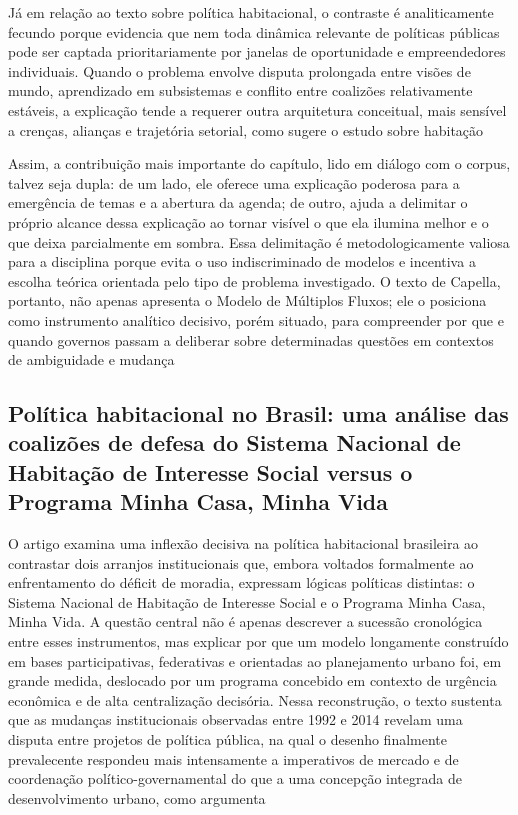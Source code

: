 \documentclass[12pt,a4paper]{article}
\begin{document}
Já em relação ao texto sobre política habitacional, o contraste é analiticamente fecundo porque evidencia que nem toda dinâmica relevante de políticas públicas pode ser captada prioritariamente por janelas de oportunidade e empreendedores individuais. Quando o problema envolve disputa prolongada entre visões de mundo, aprendizado em subsistemas e conflito entre coalizões relativamente estáveis, a explicação tende a requerer outra arquitetura conceitual, mais sensível a crenças, alianças e trajetória setorial, como sugere o estudo sobre habitação\parencite{ferreira2019_politica_habitacional,brasil2022_abordagens_contemporaneas}

Assim, a contribuição mais importante do capítulo, lido em diálogo com o corpus, talvez seja dupla: de um lado, ele oferece uma explicação poderosa para a emergência de temas e a abertura da agenda; de outro, ajuda a delimitar o próprio alcance dessa explicação ao tornar visível o que ela ilumina melhor e o que deixa parcialmente em sombra. Essa delimitação é metodologicamente valiosa para a disciplina porque evita o uso indiscriminado de modelos e incentiva a escolha teórica orientada pelo tipo de problema investigado. O texto de Capella, portanto, não apenas apresenta o Modelo de Múltiplos Fluxos; ele o posiciona como instrumento analítico decisivo, porém situado, para compreender por que e quando governos passam a deliberar sobre determinadas questões em contextos de ambiguidade e mudança\parencite{brasil2022_abordagens_contemporaneas}



\subsection{Política habitacional no Brasil: uma análise das coalizões de defesa do Sistema Nacional de Habitação de Interesse Social versus o Programa Minha Casa, Minha Vida}
\label{sec:org9c94791}

O artigo examina uma inflexão decisiva na política habitacional brasileira ao contrastar dois arranjos institucionais que, embora voltados formalmente ao enfrentamento do déficit de moradia, expressam lógicas políticas distintas: o Sistema Nacional de Habitação de Interesse Social e o Programa Minha Casa, Minha Vida. A questão central não é apenas descrever a sucessão cronológica entre esses instrumentos, mas explicar por que um modelo longamente construído em bases participativas, federativas e orientadas ao planejamento urbano foi, em grande medida, deslocado por um programa concebido em contexto de urgência econômica e de alta centralização decisória. Nessa reconstrução, o texto sustenta que as mudanças institucionais observadas entre 1992 e 2014 revelam uma disputa entre projetos de política pública, na qual o desenho finalmente prevalecente respondeu mais intensamente a imperativos de mercado e de coordenação político-governamental do que a uma concepção integrada de desenvolvimento urbano, como argumenta\parencite{ferreira2019_politica_habitacional}
\end{document}
